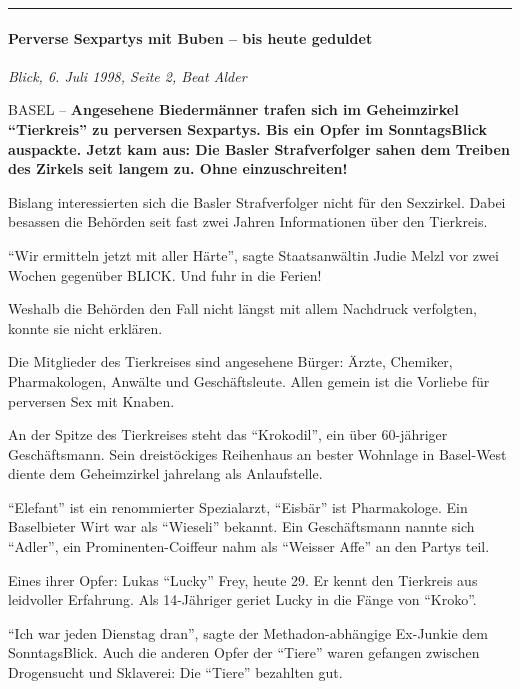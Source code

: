 \begin{center}\rule{0.5\linewidth}{\linethickness}\end{center}

\hypertarget{perverse-sexpartys-mit-buben--bis-heute-geduldet}{%
\paragraph{Perverse Sexpartys mit Buben -- bis heute
geduldet}\label{perverse-sexpartys-mit-buben--bis-heute-geduldet}}

\emph{Blick, 6. Juli 1998, Seite 2, Beat Alder}

BASEL -- \textbf{Angesehene Biedermänner trafen sich im Geheimzirkel
``Tierkreis'' zu perversen Sexpartys. Bis ein Opfer im SonntagsBlick
auspackte. Jetzt kam aus: Die Basler Strafverfolger sahen dem Treiben
des Zirkels seit langem zu. Ohne einzuschreiten!}

Bislang interessierten sich die Basler Strafverfolger nicht für den
Sexzirkel. Dabei besassen die Behörden seit fast zwei Jahren
Informationen über den Tierkreis.

``Wir ermitteln jetzt mit aller Härte'', sagte Staatsanwältin Judie
Melzl vor zwei Wochen gegenüber BLICK. Und fuhr in die Ferien!

Weshalb die Behörden den Fall nicht längst mit allem Nachdruck
verfolgten, konnte sie nicht erklären.

Die Mitglieder des Tierkreises sind angesehene Bürger: Ärzte, Chemiker,
Pharmakologen, Anwälte und Geschäftsleute. Allen gemein ist die Vorliebe
für perversen Sex mit Knaben.

An der Spitze des Tierkreises steht das ``Krokodil'', ein über
60-jähriger Geschäftsmann. Sein dreistöckiges Reihenhaus an bester
Wohnlage in Basel-West diente dem Geheimzirkel jahrelang als
Anlaufstelle.

``Elefant'' ist ein renommierter Spezialarzt, ``Eisbär'' ist
Pharmakologe. Ein Baselbieter Wirt war als ``Wieseli'' bekannt. Ein
Geschäftsmann nannte sich ``Adler'', ein Prominenten-Coiffeur nahm als
``Weisser Affe'' an den Partys teil.

Eines ihrer Opfer: Lukas ``Lucky'' Frey, heute 29. Er kennt den
Tierkreis aus leidvoller Erfahrung. Als 14-Jähriger geriet Lucky in die
Fänge von ``Kroko''.

``Ich war jeden Dienstag dran'', sagte der Methadon-abhängige Ex-Junkie
dem SonntagsBlick. Auch die anderen Opfer der ``Tiere'' waren gefangen
zwischen Drogensucht und Sklaverei: Die ``Tiere'' bezahlten gut.

